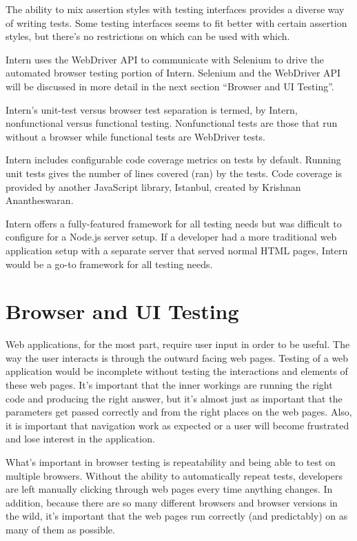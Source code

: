 \documentclass[12pt]{ucthesis}
\begin{document}
The ability to mix assertion styles with testing interfaces provides a diverse way of writing tests. Some testing interfaces seems to fit better with certain assertion styles, but there's no restrictions on which can be used with which.

Intern uses the WebDriver API to communicate with Selenium to drive the automated browser testing portion of Intern. Selenium and the WebDriver API will be discussed in more detail in the next section ``Browser and UI Testing''.

Intern's unit-test versus browser test separation is termed, by Intern, nonfunctional versus functional testing. Nonfunctional tests are those that run without a browser while functional tests are WebDriver tests.

Intern includes configurable code coverage metrics on tests by default. Running unit tests gives the number of lines covered (ran) by the tests. Code coverage is provided by another JavaScript library, Istanbul, created by Krishnan Anantheswaran\cite{Istanbul}.

Intern offers a fully-featured framework for all testing needs but was difficult to configure for a Node.js server setup. If a developer had a more traditional web application setup with a separate server that served normal HTML pages, Intern would be a go-to framework for all testing needs.

\section{Browser and UI Testing}
Web applications, for the most part, require user input in order to be useful. The way the user interacts is through the outward facing web pages. Testing of a web application would be incomplete without testing the interactions and elements of these web pages. It's important that the inner workings are running the right code and producing the right answer, but it's almost just as important that the parameters get passed correctly and from the right places on the web pages. Also, it is important that navigation work as expected or a user will become frustrated and lose interest in the application.

What's important in browser testing is repeatability and being able to test on multiple browsers. Without the ability to automatically repeat tests, developers are left manually clicking through web pages every time anything changes. In addition, because there are so many different browsers and browser versions in the wild, it's important that the web pages run correctly (and predictably) on as many of them as possible.
\end{document}
